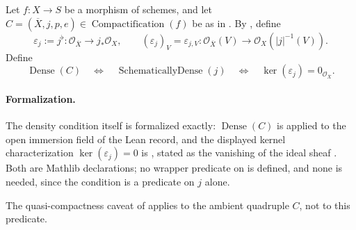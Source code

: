 \begin{definition}
  \label{def:nagata-dense-compactification}
  \leanok

  Let \(f\colon X\to S\) be a morphism of schemes, and let
  $C=(\overline X,j,p,e)\in
  \operatorname{Compactification}(f)$ be as in
  .  By
  , define
  \[
    \varepsilon_j:=j^\flat\colon\mathcal O_{\overline X}\longrightarrow
      j_*\mathcal O_X,
    \qquad
    (\varepsilon_j)_V=\varepsilon_{j,V}\colon
      \mathcal O_{\overline X}(V)\longrightarrow
      \mathcal O_X(|j|^{-1}(V)).
  \]
  Define
  \[
    \operatorname{Dense}(C)
      \quad\Longleftrightarrow\quad
    \operatorname{SchematicallyDense}(j)
      \quad\Longleftrightarrow\quad
    \ker(\varepsilon_j)=0_{\mathcal O_{\overline X}}.
  \]

  \paragraph{Formalization.}
  The density condition itself is formalized exactly: $\operatorname{Dense}(C)$ is
  \texttt{} applied to the
  open immersion field of the Lean \texttt{} record, and the
  displayed kernel characterization $\ker(\varepsilon_j)=0$ is
  \texttt{}, stated as the vanishing of the
  ideal sheaf \texttt{}.  Both are Mathlib declarations; no wrapper
  predicate on \texttt{} is defined, and none is needed, since
  the condition is a predicate on $j$ alone.

  The quasi-compactness caveat of  applies to the ambient
  quadruple $C$, not to this predicate.
\end{definition}

